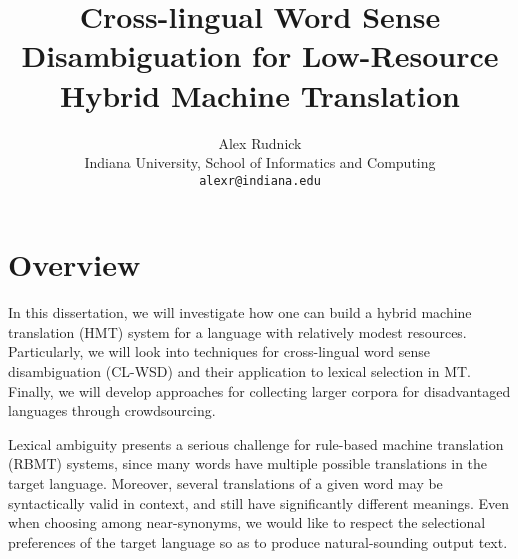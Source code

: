 \documentclass{article}
\title{Cross-lingual Word Sense Disambiguation for Low-Resource Hybrid Machine
Translation}
\author{Alex Rudnick \\
	    Indiana University, School of Informatics and Computing \\
	    {\tt alexr@indiana.edu}}
\date{}
\begin{document}
\maketitle



\section{Overview}


In this dissertation, we will investigate how one can build a hybrid machine
translation (HMT) system for a language with relatively modest resources.
Particularly, we will look into techniques for cross-lingual word sense
disambiguation (CL-WSD) and their application to lexical selection in MT.
Finally, we will develop approaches for collecting larger corpora for
disadvantaged languages through crowdsourcing.

Lexical ambiguity presents a serious challenge for rule-based machine
translation (RBMT) systems, since many words have multiple possible
translations in the target language. Moreover, several translations of a given
word may be syntactically valid in context, and still have significantly
different meanings. Even when choosing among near-synonyms, we would like to
respect the selectional preferences of the target language so as to produce
natural-sounding output text.
\end{document}
